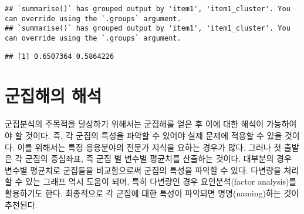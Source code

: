 \documentclass[
]{book}
\newenvironment{Shaded}{\begin{snugshade}}{\end{snugshade}}
\newcommand{\AttributeTok}[1]{\textcolor[rgb]{0.77,0.63,0.00}{#1}}
\newcommand{\DecValTok}[1]{\textcolor[rgb]{0.00,0.00,0.81}{#1}}
\newcommand{\FunctionTok}[1]{\textcolor[rgb]{0.00,0.00,0.00}{#1}}
\newcommand{\NormalTok}[1]{#1}
\newcommand{\OtherTok}[1]{\textcolor[rgb]{0.56,0.35,0.01}{#1}}
\newcommand{\SpecialCharTok}[1]{\textcolor[rgb]{0.00,0.00,0.00}{#1}}
\newcommand{\StringTok}[1]{\textcolor[rgb]{0.31,0.60,0.02}{#1}}
\begin{document}
\begin{Shaded}
\end{Shaded}

\begin{verbatim}
## `summarise()` has grouped output by 'item1', 'item1_cluster'. You can override using the `.groups` argument.
## `summarise()` has grouped output by 'item1', 'item1_cluster'. You can override using the `.groups` argument.
\end{verbatim}

\begin{verbatim}
## [1] 0.6507364 0.5864226
\end{verbatim}

\hypertarget{cluster-solution-interpretation}{%
\section{군집해의 해석}\label{cluster-solution-interpretation}}

군집분석의 주목적을 달성하기 위해서는 군집해를 얻은 후 이에 대한 해석이 가능하여야 할 것이다. 즉, 각 군집의 특성을 파악할 수 있어야 실제 문제에 적용할 수 있을 것이다. 이를 위해서는 특정 응용분야의 전문가 지식을 요하는 경우가 많다. 그러나 첫 출발은 각 군집의 중심좌표, 즉 군집 별 변수별 평균치를 산출하는 것이다. 대부분의 경우 변수별 평균치로 군집들을 비교함으로써 군집의 특성을 파악할 수 있다. 다변량을 처리할 수 있는 그래프 역시 도움이 되며, 특히 다변량인 경우 요인분석(factor analysis)를 활용하기도 한다. 최종적으로 각 군집에 대한 특성이 파악되면 명명(naming)하는 것이 추천된다.
\end{document}
